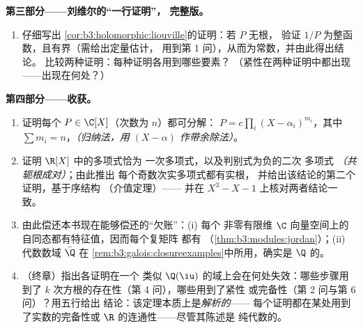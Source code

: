 \begin{problem}
\medskip
\noindent\textbf{第三部分——刘维尔的“一行证明”，
完整版。}
\begin{enumerate}[resume]
  \item 仔细写出
        \cref{cor:b3:holomorphic:liouville}的证明：若 $P$ 无根，
        验证 $1/P$ 为整函数，且有界（需给出定量估计，
        用到第 1 问），从而为常数，并由此得出结论。
        比较两种证明：每种证明各用到哪些要素？
        （紧性在两种证明中都出现——出现在何处？）
\end{enumerate}

\medskip
\noindent\textbf{第四部分——收获。}
\begin{enumerate}[resume]
  \item 证明每个 $P \in \C[X]$（次数为 $n$）都可分解：
        $P = c\prod_{i}(X - \alpha_i)^{m_i}$，其中 $\sum m_i =
        n$，\emph{（归纳法，用 $(X -
        \alpha)$ 作带余除法）}。
  \item 证明 $\R[X]$ 中的多项式恰为
        一次多项式，以及判别式为负的二次
        多项式 \emph{（共轭根成对）}；由此推出
        每个奇数次实多项式都有实根，
        并给出该结论的第二个证明，基于序结构
        （介值定理）——
        并在 $X^3 - X - 1$ 上核对两者结论一致。
  \item 由此偿还本书现在能够偿还的“欠账”：(i) 每个
        非零有限维
        $\C$ 向量空间上的自同态都有特征值，因而每个复矩阵
        都有
        （\cref{thm:b3:modules:jordan}）；(ii) 代数数域
        $\bar\Q$ 在
        \cref{rem:b3:galois:closureexamples}中所用，确实是
        $\Q$ 的。
  \item （终章）指出各证明在一个
        类似 $\Q(\iu)$ 的域上会在何处失效：哪些步骤用到了
        $k$ 次方根的存在性（第 4 问），哪些用到了紧性
        或完备性（第 2 问与第 6 问）？用五行给出
        结论：该定理本质上是\emph{解析的}——
        每个证明都在某处用到了实数的完备性或
        $\R$ 的连通性——尽管其陈述是
        纯代数的。
\end{enumerate}


\end{problem}
